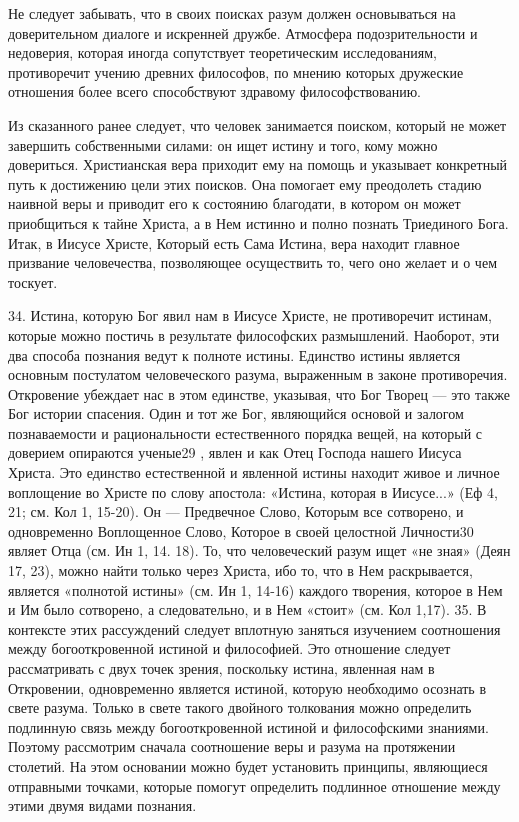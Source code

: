 \documentclass[a5paper,10pt]{article}
\begin{document}
Не следует забывать, что в своих поисках разум должен основываться на
доверительном диалоге и искренней дружбе. Атмосфера подозрительности и
недоверия, которая иногда сопутствует теоретическим исследованиям, противоречит
учению древних философов, по мнению которых дружеские отношения более всего
способствуют здравому философствованию.

Из сказанного ранее следует, что человек занимается поиском, который не может
завершить собственными силами: он ищет истину и того, кому можно довериться.
Христианская вера приходит ему на помощь и указывает конкретный путь к
достижению цели этих поисков. Она помогает ему преодолеть стадию наивной веры и
приводит его к состоянию благодати, в котором он может приобщиться к тайне
Христа, а в Нем истинно и полно познать Триединого Бога. Итак, в Иисусе Христе,
Который есть Сама Истина, вера находит главное призвание человечества,
позволяющее осуществить то, чего оно желает и о чем тоскует.

34. Истина, которую Бог явил нам в Иисусе Христе, не противоречит истинам,
которые можно постичь в результате философских размышлений. Наоборот, эти два
способа познания ведут к полноте истины. Единство истины является основным
постулатом человеческого разума, выраженным в законе противоречия. Откровение
убеждает нас в этом единстве, указывая, что Бог Творец — это также Бог истории
спасения. Один и тот же Бог, являющийся основой и залогом познаваемости и
рациональности естественного порядка вещей, на который с доверием опираются
ученые29 , явлен и как Отец Господа нашего Иисуса Христа. Это единство
естественной и явленной истины находит живое и личное воплощение во Христе по
слову апостола: «Истина, которая в Иисусе...» (Еф 4, 21; см. Кол 1, 15-20). Он
— Предвечное Слово, Которым все сотворено, и одновременно Воплощенное Слово,
Которое в своей целостной Личности30 являет Отца (см. Ин 1, 14. 18). То, что
человеческий разум ищет «не зная» (Деян 17, 23), можно найти только через
Христа, ибо то, что в Нем раскрывается, является «полнотой истины» (см. Ин 1,
14-16) каждого творения, которое в Нем и Им было сотворено, а следовательно, и
в Нем «стоит» (см. Кол 1,17). 35. В контексте этих рассуждений следует вплотную
заняться изучением соотношения между богооткровенной истиной и философией. Это
отношение следует рассматривать с двух точек зрения, поскольку истина, явленная
нам в Откровении, одновременно является истиной, которую необходимо осознать в
свете разума. Только в свете такого двойного толкования можно определить
подлинную связь между богооткровенной истиной и философскими знаниями. Поэтому
рассмотрим сначала соотношение веры и разума на протяжении столетий. На этом
основании можно будет установить принципы, являющиеся отправными точками,
которые помогут определить подлинное отношение между этими двумя видами
познания.
\end{document}
